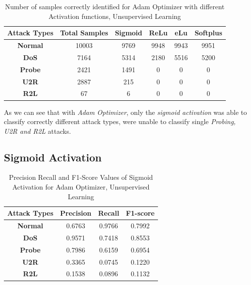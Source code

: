 \documentclass[12pt, a4paper]{report}
\begin{document}
\begin{appendices}
 
	\begin{table}[h]
	\centering
	\captionsetup{justification=centering,margin=2cm}
	\begin{tabular}{|c|c|c|c|c|c|}
	\hline
	\textbf{Attack Types} & \textbf{Total Samples} & \textbf{Sigmoid} & \textbf{ReLu} & \textbf{eLu} & \textbf{Softplus} \\ \hline
	\textbf{Normal}       & 10003                  & 9769            & 9948         & 9943        & 9951           \\ \hline
	\textbf{DoS}          & 7164                  & 5314            & 2180         & 5516        & 5200             \\ \hline
	\textbf{Probe}        & 2421                  & 1491             & 0          & 0         & 0              \\ \hline
	\textbf{U2R}          & 2887                    & 215             & 0           & 0          & 0               \\ \hline
	\textbf{R2L}          & 67                     & 6               & 0            & 0           & 0                \\ \hline
	\end{tabular}
	\caption{Number of samples correctly identified for Adam Optimizer with different Activation functions, Unsupervised Learning}
	\label{confusion_adam_tf}
	\end{table}
  
  As we can see that with \textit{Adam Optimizer}, only the \textit{sigmoid activation} was able to classify correctly different attack types, were unable to classify single \textit{Probing, U2R and R2L} attacks.
   \subsection{Sigmoid Activation}
 	 \begin{table}[ht]
		\centering
		\captionsetup{justification=centering,margin=2cm}
		\begin{tabular}{|c|c|c|c|}
		\hline
		\textbf{Attack Types} & \textbf{Precision} & \textbf{Recall} & \textbf{F1-score} \\ \hline
		\textbf{Normal}       & 0.6763             & 0.9766          & 0.7992            \\ \hline
		\textbf{DoS}          & 0.9571             & 0.7418          & 0.8553            \\ \hline
		\textbf{Probe}        & 0.7986             & 0.6159          & 0.6954            \\ \hline
		\textbf{U2R}          & 0.3365             & 0.0745          & 0.1220            \\ \hline
		\textbf{R2L}          & 0.1538             & 0.0896          & 0.1132            \\ \hline
		\end{tabular}
		\caption{Precision Recall and F1-Score Values of Sigmoid Activation for Adam Optimizer, Unsupervised Learning}
		\label{classification sigmoid adam tf}
		\end{table} 
  

\end{appendices}
\end{document}
